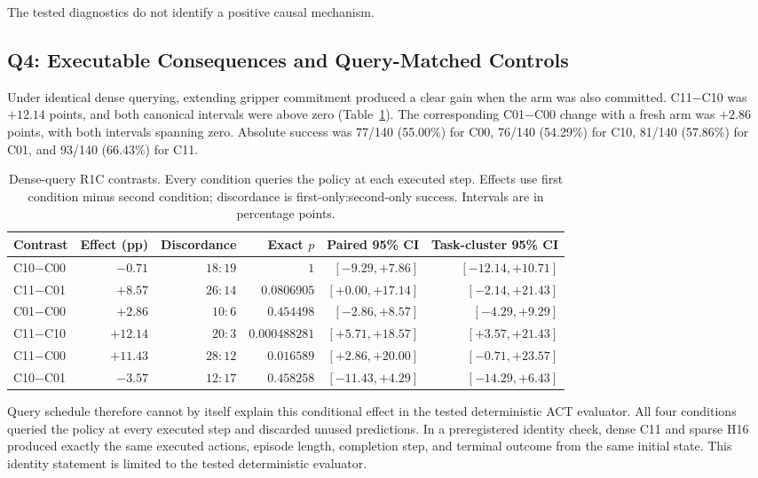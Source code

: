 The tested diagnostics do not identify a positive causal mechanism.

\subsection{Q4: Executable Consequences and Query-Matched Controls}

Under identical dense querying, extending gripper commitment produced a clear
gain when the arm was also committed. C11$-$C10 was $+12.14$ points, and both
canonical intervals were above zero (Table~\ref{tab:r1c}). The corresponding
C01$-$C00 change with a fresh arm was $+2.86$ points, with both intervals
spanning zero. Absolute success was 77/140 (55.00\%) for C00, 76/140 (54.29\%)
for C10, 81/140 (57.86\%) for C01, and 93/140 (66.43\%) for C11.

\begin{table}[t]
\centering
\caption{Dense-query R1C contrasts. Every condition queries the policy at each
executed step. Effects use first condition minus second condition; discordance
is first-only:second-only success. Intervals are in percentage points.}
\label{tab:r1c}
\scriptsize
\begin{tabular*}{\textwidth}{@{\extracolsep{\fill}}lrrrrr}
\toprule
Contrast & Effect (pp) & Discordance & Exact $p$ & Paired 95\% CI & Task-cluster 95\% CI \\
\midrule
C10$-$C00 & $-0.71$ & $18{:}19$ & $1$ & $[-9.29,+7.86]$ & $[-12.14,+10.71]$ \\
C11$-$C01 & $+8.57$ & $26{:}14$ & $0.0806905$ & $[+0.00,+17.14]$ & $[-2.14,+21.43]$ \\
C01$-$C00 & $+2.86$ & $10{:}6$ & $0.454498$ & $[-2.86,+8.57]$ & $[-4.29,+9.29]$ \\
C11$-$C10 & $+12.14$ & $20{:}3$ & $0.000488281$ & $[+5.71,+18.57]$ & $[+3.57,+21.43]$ \\
C11$-$C00 & $+11.43$ & $28{:}12$ & $0.016589$ & $[+2.86,+20.00]$ & $[-0.71,+23.57]$ \\
C10$-$C01 & $-3.57$ & $12{:}17$ & $0.458258$ & $[-11.43,+4.29]$ & $[-14.29,+6.43]$ \\
\bottomrule
\end{tabular*}
\end{table}

Query schedule therefore cannot by itself explain this conditional effect in
the tested deterministic ACT evaluator. All four conditions queried the policy
at every executed step and discarded unused predictions. In a preregistered
identity check, dense C11 and sparse H16 produced exactly the same executed
actions, episode length, completion step, and terminal outcome from the same
initial state. This identity statement is limited to the tested deterministic
evaluator.

